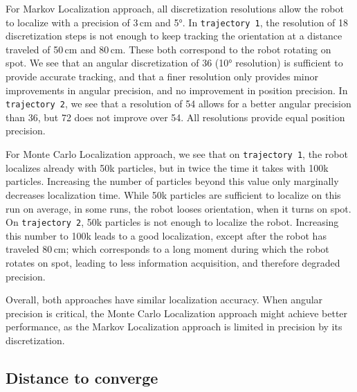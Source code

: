 \documentclass[letterpaper, 10pt, conference]{ieeeconf}
\begin{document}
For Markov Localization approach, all discretization resolutions allow the robot to localize with a precision of 3\,cm and 5°.
In \texttt{trajectory~1}, the resolution of 18 discretization steps is not enough to keep tracking the orientation at a distance traveled of 50\,cm and 80\,cm.
These both correspond to the robot rotating on spot.
We see that an angular discretization of 36 (10° resolution) is sufficient to provide accurate tracking, and that a finer resolution only provides minor improvements in angular precision, and no improvement in position precision.
In \texttt{trajectory~2}, we see that a resolution of 54 allows for a better angular precision than 36, but 72 does not improve over 54.
All resolutions provide equal position precision.

For Monte Carlo Localization approach, we see that on \texttt{trajectory~1}, the robot localizes already with 50k particles, but in twice the time it takes with 100k particles.
Increasing the number of particles beyond this value only marginally decreases localization time.
While 50k particles are sufficient to localize on this run on average, in some runs, the robot looses orientation, when it turns on spot.
On \texttt{trajectory~2}, 50k particles is not enough to localize the robot.
Increasing this number to 100k leads to a good localization, except after the robot has traveled 80\,cm; which corresponds to a long moment during which the robot rotates on spot, leading to less information acquisition, and therefore degraded precision.

Overall, both approaches have similar localization accuracy.
When angular precision is critical, the Monte Carlo Localization approach might achieve better performance, as the Markov Localization approach is limited in precision by its discretization.


\subsection{Distance to converge}
\end{document}
